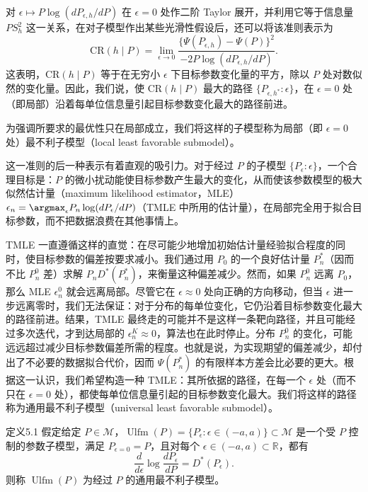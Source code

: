 对 $\epsilon\mapsto P\log(dP_{\epsilon,h}/dP)$ 在 $\epsilon=0$ 处作二阶 Taylor 展开，并利用它等于信息量 $PS_h^2$ 这一关系，在对子模型作出某些光滑性假设后，还可以将该准则表示为
\[
 \mathrm{CR}(h\mid P)=
 \lim_{\epsilon\to0}
 \frac{\{\Psi(P_{\epsilon,h})-\Psi(P)\}^2}
 {-2P\log(dP_{\epsilon,h}/dP)}.
\]
这表明，$\mathrm{CR}(h\mid P)$ 等于在无穷小 $\epsilon$ 下目标参数变化量的平方，除以 $P$ 处对数似然的变化量。因此，我们说，使 $\mathrm{CR}(h\mid P)$ 最大的路径 $\{P_{\epsilon,h^*}:\epsilon\}$，在 $\epsilon=0$ 处（即局部）沿着每单位信息量引起目标参数变化最大的路径前进。

\begin{sourcebox}
为强调所要求的最优性只在局部成立，我们将这样的子模型称为局部（即 $\epsilon=0$ 处）最不利子模型（local least favorable submodel）。
\end{sourcebox}

这一准则的后一种表示有着直观的吸引力。对于经过 $P$ 的子模型 $\{P_\epsilon:\epsilon\}$，一个合理目标是：$P$ 的微小扰动能使目标参数产生最大的变化，从而使该参数模型的极大似然估计量（maximum likelihood estimator，MLE）
$\epsilon_n=\argmax_\epsilon P_n\log(dP_\epsilon/dP)$（TMLE 中所用的估计量），在局部完全用于拟合目标参数，而不把数据浪费在其他事情上。

TMLE 一直遵循这样的直觉：在尽可能少地增加初始估计量经验拟合程度的同时，使目标参数的偏差按要求减小。我们通过用 $P_0$ 的一个良好估计量 $P_n^*$（因而不比 $P_n^0$ 差）求解 $P_nD^*(P_n^*)$，来衡量这种偏差减少。然而，如果 $P_n^0$ 远离 $P_0$，那么 MLE $\epsilon_n^0$ 就会远离局部。尽管它在 $\epsilon\approx0$ 处向正确的方向移动，但当 $\epsilon$ 进一步远离零时，我们无法保证：对于分布的每单位变化，它仍沿着目标参数变化最大的路径前进。结果，TMLE 最终走的可能并不是这样一条靶向路径，并且可能经过多次迭代，才到达局部的 $\epsilon_n^K\approx0$，算法也在此时停止。分布 $P_n^0$ 的变化，可能远远超过减少目标参数偏差所需的程度。也就是说，为实现期望的偏差减少，却付出了不必要的数据拟合代价，因而 $\Psi(P_n^*)$ 的有限样本方差会比必要的更大。根据这一认识，我们希望构造一种 TMLE：其所依据的路径，在每一个 $\epsilon$ 处（而不只在 $\epsilon=0$ 处），都使每单位信息量引起的目标参数变化最大。我们将这样的路径称为通用最不利子模型（universal least favorable submodel）。

\begin{bookresult}{定义}{5.1}
假定给定 $P\in\mathcal M$，$\operatorname{Ulfm}(P)=\{P_\epsilon:\epsilon\in(-a,a)\}\subset\mathcal M$ 是一个受 $P$ 控制的参数子模型，满足 $P_{\epsilon=0}=P$，且对每个 $\epsilon\in(-a,a)\subset\mathbb R$，都有
\begin{equation}
 \frac{d}{d\epsilon}\log\frac{dP_\epsilon}{dP}=D^*(P_\epsilon).
 \tag{5.1}
\end{equation}
则称 $\operatorname{Ulfm}(P)$ 为经过 $P$ 的通用最不利子模型。
\end{bookresult}

